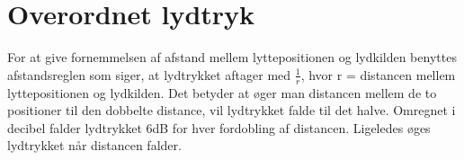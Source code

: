 \section{Overordnet lydtryk}

For at give fornemmelsen af afstand mellem lyttepositionen og lydkilden benyttes afstandsreglen som siger, at lydtrykket aftager med $\frac{1}{r}$, hvor r = distancen mellem lyttepositionen og lydkilden. Det betyder at øger man distancen mellem de to positioner til den dobbelte distance, vil lydtrykket falde til det halve. Omregnet i decibel falder lydtrykket 6dB for hver fordobling af distancen. Ligeledes øges lydtrykket når distancen falder. 